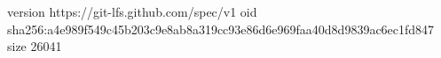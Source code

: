 version https://git-lfs.github.com/spec/v1
oid sha256:a4e989f549c45b203c9e8ab8a319cc93e86d6e969faa40d8d9839ac6ec1fd847
size 26041
